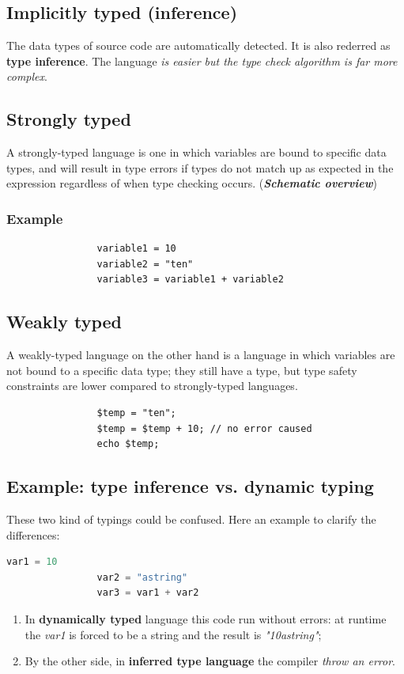 \documentclass[12pt]{article}
\begin{document}
	\subsection{Implicitly typed (inference)}
		The data types of source code are automatically detected. It is also rederred as \textbf{type inference}. The language \textit{is easier but the type check algorithm is far more complex}.
	\subsection{Strongly typed}
		A strongly-typed language is one in which variables are bound to specific data types, and will result in type errors if types do not match up as expected in the expression regardless of when type checking occurs. (\textbf{\textit{Schematic overview}})\\
		\subsubsection{Example}
			\begin{lstlisting}
				variable1 = 10
				variable2 = "ten"
				variable3 = variable1 + variable2
			\end{lstlisting}
	\subsection{Weakly typed} 
		A weakly-typed language on the other hand is a language in which variables are not bound to a specific data type; they still have a type, but type safety constraints are lower compared to strongly-typed languages.\\
			\begin{lstlisting}
				$temp = "ten"; 
				$temp = $temp + 10; // no error caused
				echo $temp;
			\end{lstlisting}
			
			
		
	
		\subsection{Example: type inference vs. dynamic typing}
			These two kind of typings could be confused. Here an example to clarify the differences:

			\begin{lstlisting}[language=Python]
				var1 = 10
				var2 = "astring"
				var3 = var1 + var2
			\end{lstlisting}
			
			\begin{enumerate}
				\item In \textbf{dynamically typed} language this code run without errors: at runtime the \textit{var1} is forced to be a string and the result is \textit{"10astring"};
				\item By the other side, in \textbf{inferred type language} the compiler \textit{throw an error}.
			\end{enumerate}
\newpage
\end{document}
